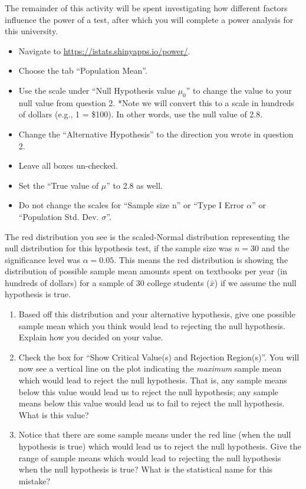 \documentclass[
]{report}
\begin{document}
The remainder of this activity will be spent investigating how different factors influence the power of a test, after which you will complete a power analysis for this university.

\begin{itemize}
\item
  Navigate to \url{https://istats.shinyapps.io/power/}.
\item
  Choose the tab ``Population Mean''.
\item
  Use the scale under ``Null Hypothesis value \(\mu_0\)'' to change the value to your null value from question 2. *Note we will convert this to a scale in hundreds of dollars (e.g., 1 = \$100). In other words, use the null value of 2.8.
\item
  Change the ``Alternative Hypothesis'' to the direction you wrote in question 2.
\item
  Leave all boxes un-checked.
\item
  Set the ``True value of \(\mu\)'' to 2.8 as well.
\item
  Do not change the scales for ``Sample size n'' or ``Type I Error \(\alpha\)'' or ``Population Std. Dev. \(\sigma\)''.
\end{itemize}

The red distribution you see is the scaled-Normal distribution representing the null distribution for this hypothesis test, if the sample size was \(n = 30\) and the significance level was \(\alpha = 0.05\). This means the red distribution is showing the distribution of possible sample mean amounts spent on textbooks per year (in hundreds of dollars) for a sample of 30 college students (\(\bar{x}\)) if we assume the null hypothesis is true.

\begin{enumerate}
\def\labelenumi{\arabic{enumi}.}
\setcounter{enumi}{2}
\item
  Based off this distribution and your alternative hypothesis, give one possible sample mean which you think would lead to rejecting the null hypothesis. Explain how you decided on your value.
  \vspace{0.25in}
\item
  Check the box for ``Show Critical Value(s) and Rejection Region(s)''. You will now see a vertical line on the plot indicating the \emph{maximum} sample mean which would lead to reject the null hypothesis. That is, any sample means below this value would lead us to reject the null hypothesis; any sample means below this value would lead us to fail to reject the null hypothesis. What is this value?\\
  \vspace{0.25in}
\item
  Notice that there are some sample means under the red line (when the null hypothesis is true) which would lead us to reject the null hypothesis. Give the range of sample means which would lead to rejecting the null hypothesis when the null hypothesis is true? What is the statistical name for this mistake?
  \vspace{0.4in}
\end{enumerate}
\end{document}
